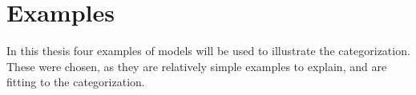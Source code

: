 \chapter{Examples}




In this thesis four examples of models will be used to illustrate the categorization. These were chosen, as they are relatively simple examples to explain, and are fitting to the categorization.



